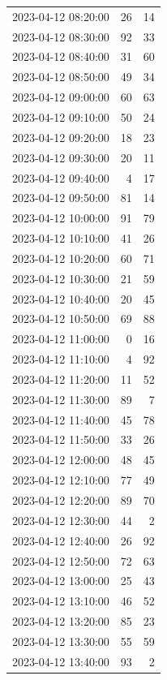 \documentclass[
  letterpaper,
  DIV=11,
  numbers=noendperiod]{scrartcl}
\begin{document}
\begin{tabular}{lrr}
2023-04-12 08:20:00 &    26 &    14 \\
2023-04-12 08:30:00 &    92 &    33 \\
2023-04-12 08:40:00 &    31 &    60 \\
2023-04-12 08:50:00 &    49 &    34 \\
2023-04-12 09:00:00 &    60 &    63 \\
2023-04-12 09:10:00 &    50 &    24 \\
2023-04-12 09:20:00 &    18 &    23 \\
2023-04-12 09:30:00 &    20 &    11 \\
2023-04-12 09:40:00 &     4 &    17 \\
2023-04-12 09:50:00 &    81 &    14 \\
2023-04-12 10:00:00 &    91 &    79 \\
2023-04-12 10:10:00 &    41 &    26 \\
2023-04-12 10:20:00 &    60 &    71 \\
2023-04-12 10:30:00 &    21 &    59 \\
2023-04-12 10:40:00 &    20 &    45 \\
2023-04-12 10:50:00 &    69 &    88 \\
2023-04-12 11:00:00 &     0 &    16 \\
2023-04-12 11:10:00 &     4 &    92 \\
2023-04-12 11:20:00 &    11 &    52 \\
2023-04-12 11:30:00 &    89 &     7 \\
2023-04-12 11:40:00 &    45 &    78 \\
2023-04-12 11:50:00 &    33 &    26 \\
2023-04-12 12:00:00 &    48 &    45 \\
2023-04-12 12:10:00 &    77 &    49 \\
2023-04-12 12:20:00 &    89 &    70 \\
2023-04-12 12:30:00 &    44 &     2 \\
2023-04-12 12:40:00 &    26 &    92 \\
2023-04-12 12:50:00 &    72 &    63 \\
2023-04-12 13:00:00 &    25 &    43 \\
2023-04-12 13:10:00 &    46 &    52 \\
2023-04-12 13:20:00 &    85 &    23 \\
2023-04-12 13:30:00 &    55 &    59 \\
2023-04-12 13:40:00 &    93 &     2 \\

\end{tabular}
\end{document}
